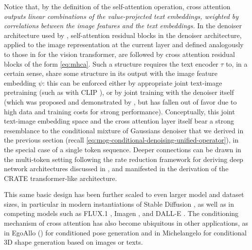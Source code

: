 \documentclass[../../book-main.tex]{subfiles}
\begin{document}
Notice that, by the definition of the self-attention operation, cross attention
\textit{outputs linear combinations of the value-projected text embeddings,
weighted by correlations between the image features and the text embeddings.}
In the denoiser architecture used by \textcite{rombach2022high}, 
self-attention residual blocks in the denoiser architecture, applied to the
image representation at the current layer and defined analogously
to those in  for the vision transformer, are followed by cross
attention residual blocks of the form \eqref{eq:mhca}.
Such a structure requires the text encoder $\tau$ to, in a certain sense, share some
structure in its output with the image feature embedding $\psi$: this can be
enforced either by appropriate joint text-image pretraining (such as with CLIP
\cite{Radford2021-ir}), or by joint training with
the denoiser itself (which was proposed and demonstrated by
\textcite{rombach2022high}, but has fallen out of favor due to high data and
training costs for strong performance).
Conceptually, this joint text-image embedding space and the cross attention
layer itself bear a strong resemblance to the
conditional mixture of Gaussians denoiser that we derived in the previous
section (recall \eqref{eq:mog-conditional-denoising-unified-operator}), in the
special case of a single token sequence. Deeper
connections can be drawn in the multi-token setting following the rate reduction
framework for deriving deep network architectures discussed in
, and manifested in the derivation of the CRATE
transformer-like architecture.

This same basic design has been further scaled to even larger model and dataset
sizes, in particular in modern instantiations of Stable Diffusion
\cite{DBLP:conf/icml/EsserKBEMSLLSBP24}, as well as in competing models such as
FLUX.1 \cite{Labs2025-fb}, Imagen \cite{Saharia2022-na}, and DALL-E \cite{Ramesh2022-nu}. 
The conditioning mechanism of cross attention has also become ubiquitous in
other applications, as in EgoAllo () for conditioned pose generation and in Michelangelo \cite{zhao2023michelangelo} for conditional 3D shape generation based on images or texts. 


%
\end{document}
